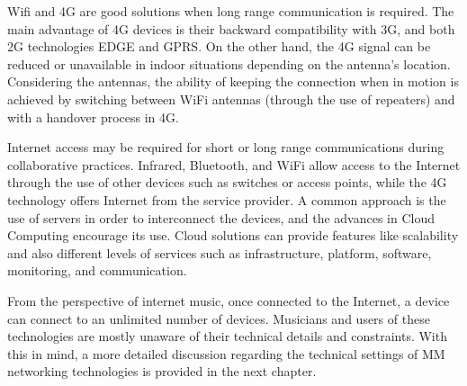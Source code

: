 Wifi and 4G are good solutions when long range communication is required.
The main advantage of 4G devices is their backward compatibility with 3G, and both 2G technologies EDGE and GPRS.
On the other hand, the 4G signal can be reduced or unavailable in indoor situations depending on the antenna's location.
Considering the antennas, the ability of keeping the connection when in motion is achieved by switching between WiFi antennas (through the use of repeaters) and with a handover process in 4G.

Internet access may be required for short or long range communications during collaborative practices.
Infrared, Bluetooth, and WiFi allow access to the Internet through the use of other devices such as switches or access points, while the 4G technology offers Internet from the service provider.
A common approach is the use of servers in order to interconnect the devices, and the advances in Cloud Computing encourage its use.
Cloud solutions can provide features like scalability and also different levels of services such as infrastructure, platform, software, monitoring, and communication.

From the perspective of internet music, once connected to the Internet, a device can connect to an unlimited number of devices.
Musicians and users of these technologies are mostly unaware of their technical details and constraints.
With this in mind, a more detailed discussion regarding the technical settings of MM networking technologies is provided in the next chapter.